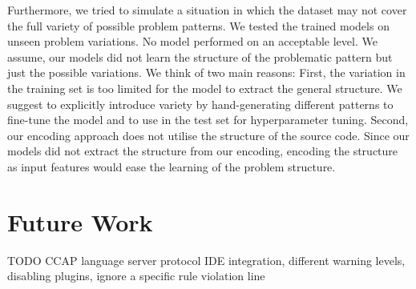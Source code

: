 Furthermore, we tried to simulate a situation in which the dataset may not cover the full variety of possible problem patterns. We tested the trained models on unseen problem variations. No model performed on an acceptable level. We assume, our models did not learn the structure of the problematic pattern but just the possible variations. 
We think of two main reasons: First, the variation in the training set is too limited for the model to extract the general structure. We suggest to explicitly introduce variety by hand-generating different patterns to fine-tune the model and to use in the test set for hyperparameter tuning.
Second, our encoding approach does not utilise the structure of the source code. Since our models did not extract the structure from our encoding, encoding the structure as input features would ease the learning of the problem structure.  

\section{Future Work}
TODO
CCAP language server protocol IDE integration, different warning levels, disabling plugins, ignore a specific rule violation line